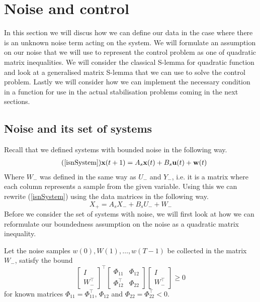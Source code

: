 \section{Noise and control} \label{sectionNoise}
In this section we will discus how we can define our data in the case where there is an unknown noise term acting on the system. We will formulate an assumption on our noise that we will use to represent the control problem as one of quadratic matrix inequalities. We will consider the classical S-lemma for quadratic function and look at a generalised matrix S-lemma that we can use to solve the control problem. Lastly we will consider how we can implement the necessary condition in a function for use in the actual stabilisation problems coming in the next sections.



\subsection{Noise and its set of systems}
Recall that we defined systems with bounded noise in the following way.
\begin{align} \tag{\ref{isnSystem}}
\mathbf{x}(t+1) &= A_s \mathbf{x}(t) + B_s \mathbf{u}(t) + \mathbf{w}(t)
\end{align}
Where $W_-$ was defined in the same way as $U_-$ and $Y_-$, i.e. it is a matrix where each column represents a sample from the given variable. Using this we can rewrite (\ref{isnSystem}) using the data matrices in the following way.
\begin{equation} \label{isnSystemData}
	X_+ = A_s X_- + B_s U_- + W_-
\end{equation}
Before we consider the set of systems with noise, we will first look at how we can reformulate our boundedness assumption on the noise as a quadratic matrix inequality.

\cite[Assumption 1]{waarde2020noisy}
Let the noise samples $w(0),W(1),\dots,w(T-1)$ be collected in the matrix $W_-$, satisfy the bound
\begin{equation} \label{noiseBound}
	\begin{bmatrix} I \\ W_-^\top \end{bmatrix} ^\top
	\begin{bmatrix} \Phi_{11} & \Phi_{12} \\ \Phi_{12}^\top & \Phi_{22} \end{bmatrix}
	\begin{bmatrix} I \\ W_-^\top \end{bmatrix} \geq 0
\end{equation}
for known matrices $\Phi_{11} = \Phi_{11}^\top$, $\Phi_{12}$ and $\Phi_{22} = \Phi_{22}^\top < 0$.

